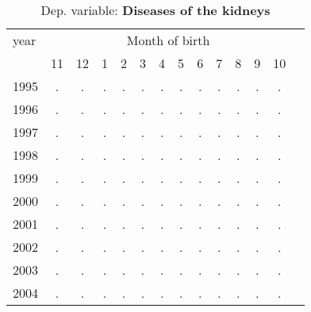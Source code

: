  \begin{table}[H] \begin{threeparttable} \centering \caption{Dep. variable: \textbf{Diseases of the kidneys}} {\def\sym#1{\ifmmode^{#1}\else\(^{#1}\)\fi} \begin{tabular}{l*{13}{c}} \toprule year & \multicolumn{12}{c}{Month of birth} \\ \cmidrule(lr){2-13} 
            &          11&          12&           1&           2&           3&           4&           5&           6&           7&           8&           9&          10\\
1995        &           .&           .&           .&           .&           .&           .&           .&           .&           .&           .&           .&           .\\
1996        &           .&           .&           .&           .&           .&           .&           .&           .&           .&           .&           .&           .\\
1997        &           .&           .&           .&           .&           .&           .&           .&           .&           .&           .&           .&           .\\
1998        &           .&           .&           .&           .&           .&           .&           .&           .&           .&           .&           .&           .\\
1999        &           .&           .&           .&           .&           .&           .&           .&           .&           .&           .&           .&           .\\
2000        &           .&           .&           .&           .&           .&           .&           .&           .&           .&           .&           .&           .\\
2001        &           .&           .&           .&           .&           .&           .&           .&           .&           .&           .&           .&           .\\
2002        &           .&           .&           .&           .&           .&           .&           .&           .&           .&           .&           .&           .\\
2003        &           .&           .&           .&           .&           .&           .&           .&           .&           .&           .&           .&           .\\
2004        &           .&           .&           .&           .&           .&           .&           .&           .&           .&           .&           .&           .\\

\end{tabular}}
\end{threeparttable}
\end{table}
